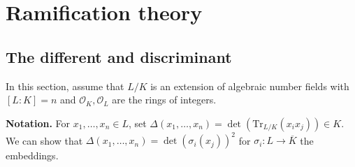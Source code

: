 \documentclass{article}
\theoremstyle{definition}
\begin{document}
\section{Ramification theory}
\subsection{The different and discriminant}
In this section, assume that $L/K$ is an extension of algebraic number fields with $[L:K] = n$ and $\mathcal{O}_K, \mathcal{O}_L$ are the rings of integers.
\vspace{1mm}
 
\textbf{Notation.} For $x_1,\ldots,x_n \in L$, set $\Delta(x_1,\ldots,x_n)= \det(\text{Tr}_{L/K}(x_ix_j)) \in K$. We can show that $\Delta(x_1,\ldots,x_n) = \det(\sigma_i(x_j))^2$ for $\sigma_i : L \to \overline{K}$ the embeddings.
\end{document}
